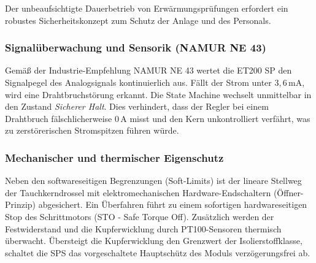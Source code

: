 Der unbeaufsichtigte Dauerbetrieb von Erwärmungsprüfungen erfordert ein robustes Sicherheitskonzept zum Schutz der Anlage und des Personals.

\subsubsection{Signalüberwachung und Sensorik (NAMUR NE 43)}
Gemäß der Industrie-Empfehlung NAMUR NE 43 wertet die ET200 SP den Signalpegel des Analogsignals kontinuierlich aus. Fällt der Strom unter $3,6\,\text{mA}$, wird eine Drahtbruchstörung erkannt. Die State Machine wechselt unmittelbar in den Zustand \textit{Sicherer Halt}. Dies verhindert, dass der Regler bei einem Drahtbruch fälschlicherweise $0\,\text{A}$ misst und den Kern unkontrolliert verfährt, was zu zerstörerischen Stromspitzen führen würde.

\subsubsection{Mechanischer und thermischer Eigenschutz}
Neben den softwareseitigen Begrenzungen (Soft-Limits) ist der lineare Stellweg der Tauchkerndrossel mit elektromechanischen Hardware-Endschaltern (Öffner-Prinzip) abgesichert. Ein Überfahren führt zu einem sofortigen hardwareseitigen Stop des Schrittmotors (STO - Safe Torque Off).
Zusätzlich werden der Festwiderstand und die Kupferwicklung durch PT100-Sensoren thermisch überwacht. Übersteigt die Kupferwicklung den Grenzwert der Isolierstoffklasse, schaltet die SPS das vorgeschaltete Hauptschütz des Moduls verzögerungsfrei ab.





